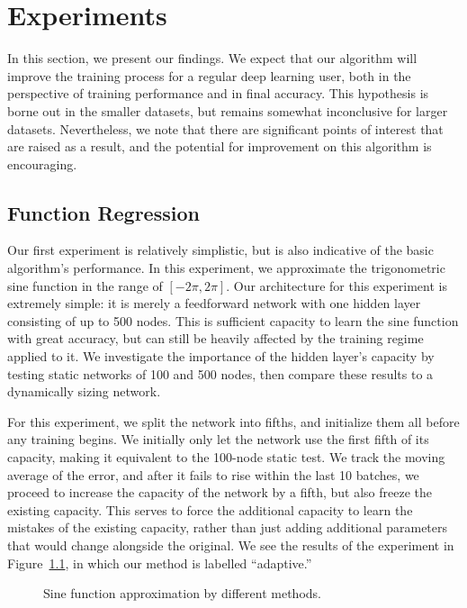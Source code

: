 \chapter{Experiments}
In this section, we present our findings.
We expect that our algorithm will improve the training process for a regular deep learning user, both in the perspective of training performance and in final accuracy.
This hypothesis is borne out in the smaller datasets, but remains somewhat inconclusive for larger datasets.
Nevertheless, we note that there are significant points of interest that are raised as a result, and the potential for improvement on this algorithm is encouraging.

\section{Function Regression}
Our first experiment is relatively simplistic, but is also indicative of the basic algorithm's performance.
In this experiment, we approximate the trigonometric sine function in the range of $[-2\pi, 2\pi]$.
Our architecture for this experiment is extremely simple: it is merely a feedforward network with one hidden layer consisting of up to 500 nodes.
This is sufficient capacity to learn the sine function with great accuracy, but can still be heavily affected by the training regime applied to it.
We investigate the importance of the hidden layer's capacity by testing static networks of 100 and 500 nodes, then compare these results to a dynamically sizing network.

For this experiment, we split the network into fifths, and initialize them all before any training begins.
We initially only let the network use the first fifth of its capacity, making it equivalent to the 100-node static test.
We track the moving average of the error, and after it fails to rise within the last 10 batches, we proceed to increase the capacity of the network by a fifth, but also freeze the existing capacity.
This serves to force the additional capacity to learn the mistakes of the existing capacity, rather than just adding additional parameters that would change alongside the original.
We see the results of the experiment in Figure~\ref{fig:sin_loss}, in which our method is labelled ``adaptive.''

\begin{figure}[!htb]
\centering
\resizebox{0.8\textwidth}{!}{}
\caption{Sine function approximation by different methods.}
\label{fig:sin_loss}
\end{figure}

